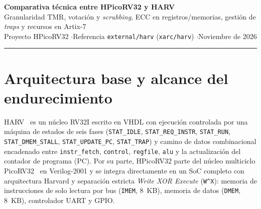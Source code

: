 \documentclass[a4paper,10pt]{article}
\begin{document}
\begin{center}
  {\LARGE\bfseries Comparativa técnica entre HPicoRV32 y HARV}\\[0.25em]
  {\normalsize\color{inkgray} Granularidad TMR, votación y \textit{scrubbing}, ECC en registros/memorias, gestión de \textit{traps} y recursos en Artix-7}\\[0.35em]
  {\footnotesize Proyecto HPicoRV32 \quad$\cdot$\quad Referencia \texttt{external/harv} (\texttt{xarc/harv}) \quad$\cdot$\quad Noviembre de 2026}
\end{center}
\vspace{-0.4em}
\noindent\rule{\textwidth}{0.6pt}

\begin{abstract}
\vspace{-0.4em}
\noindent Este documento compara las técnicas de tolerancia a fallos de \textbf{HPicoRV32} (derivado de PicoRV32 en Verilog-2001) frente al procesador de referencia \textbf{HARV} (VHDL)~\cite{santos2020dtis,harv_repo} sobre FPGA Xilinx Artix-7 (\texttt{xc7a100tcsg324-1}). El contraste abarca la granularidad del TMR, el comportamiento de votadores y \textit{scrubbing}, la codificación ECC de registros y memorias, el manejo de excepciones y las métricas de implementación y de inyección de fallos, explicitando los límites de comparabilidad entre ambos entornos.
\end{abstract}

\section{Arquitectura base y alcance del endurecimiento}

HARV~\cite{santos2020dtis,harv_repo} es un núcleo RV32I escrito en VHDL con ejecución controlada por una máquina de estados de seis fases (\texttt{STAT\_IDLE}, \texttt{STAT\_REQ\_INSTR}, \texttt{STAT\_RUN}, \texttt{STAT\_DMEM\_STALL}, \texttt{STAT\_UPDATE\_PC}, \texttt{STAT\_TRAP}) y camino de datos combinacional encadenado entre \texttt{instr\_fetch}, \texttt{control}, \texttt{regfile}, \texttt{alu} y la actualización del contador de programa (PC). Por su parte, HPicoRV32 parte del núcleo multiciclo PicoRV32~\cite{picorv32} en Verilog-2001 y se integra directamente en un SoC completo con arquitectura Harvard y separación estricta \textit{Write XOR Execute} (\texttt{W\^{}X}): memoria de instrucciones de solo lectura por bus (\texttt{IMEM}, 8~KB), memoria de datos (\texttt{DMEM}, 8~KB), controlador UART y GPIO.
\end{document}
